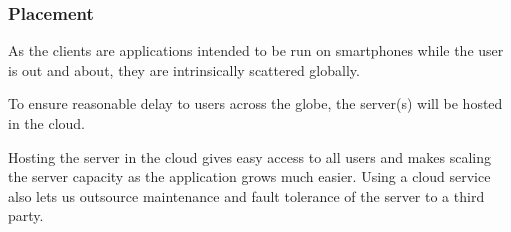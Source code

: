
\subsubsection{Placement}

As the clients are applications intended to be run on smartphones while the user is out and about, they are intrinsically scattered globally.

To ensure reasonable delay to users across the globe, the server(s) will be hosted in the cloud.

Hosting the server in the cloud gives easy access to all users and makes scaling the server capacity as the application grows much easier. Using a cloud service also lets us outsource maintenance and fault tolerance of the server to a third party. 




